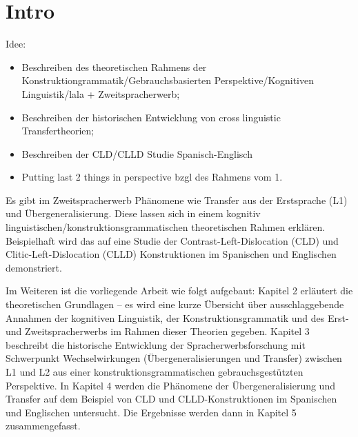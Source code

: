 \section{Intro}

\begin{comment}
* ca 3/4 Seiten
* Untersuchungsgegenstand
* Erkenntnisinteresse
* Forschungsstand
* Vorgehensweise: also Section 2 macht blabla, Section 3 blablup, ....
* Ergebnisse können/sollen angedeuten werden
\end{comment}

Idee:
\begin{itemize}
    \item Beschreiben des theoretischen Rahmens der Konstruktiongrammatik/Gebrauchsbasierten Perspektive/Kognitiven Linguistik/lala + Zweitspracherwerb;
    \item Beschreiben der historischen Entwicklung von cross linguistic Transfertheorien;
    \item Beschreiben der CLD/CLLD Studie Spanisch-Englisch
    \item Putting last 2 things in perspective bzgl des Rahmens vom 1.
\end{itemize}

Es gibt im Zweitspracherwerb Phänomene wie Transfer aus der Erstsprache (L1) und Übergeneralisierung.
Diese lassen sich in einem kognitiv linguistischen/konstruktionsgrammatischen theoretischen Rahmen erklären.
Beispielhaft wird das auf eine Studie der Contrast-Left-Dislocation (CLD) und Clitic-Left-Dislocation (CLLD) Konstruktionen im Spanischen und Englischen demonstriert.

Im Weiteren ist die vorliegende Arbeit wie folgt aufgebaut:
Kapitel 2 erläutert die theoretischen Grundlagen -- es wird eine kurze Übersicht über ausschlaggebende Annahmen der kognitiven Linguistik, der Konstruktionsgrammatik und des Erst- und Zweitspracherwerbs im Rahmen dieser Theorien gegeben.
Kapitel 3 beschreibt die historische Entwicklung der Spracherwerbsforschung mit Schwerpunkt Wechselwirkungen (Übergeneralisierungen und Transfer) zwischen L1 und L2 aus einer konstruktionsgrammatischen gebrauchsgestützten Perspektive.
In Kapitel 4 werden die Phänomene der Übergeneralisierung und Transfer auf dem Beispiel von CLD und CLLD-Konstruktionen im Spanischen und Englischen untersucht.
Die Ergebnisse werden dann in Kapitel 5 zusammengefasst. %
